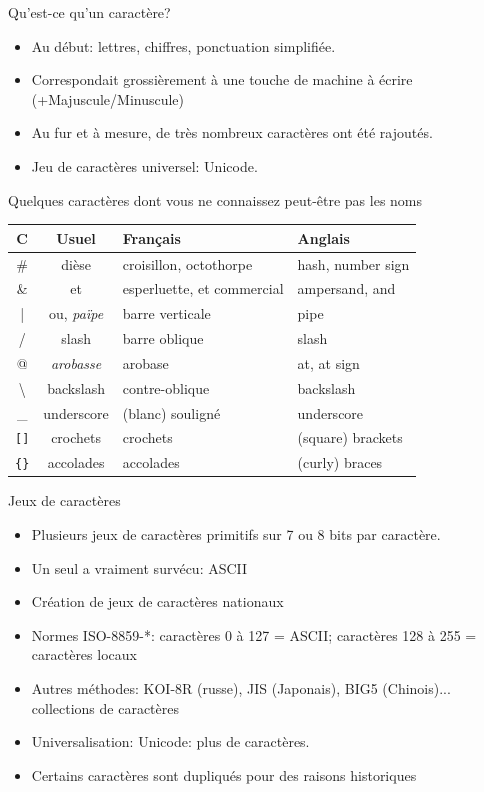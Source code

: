 \begin{frame}[fragile]{Qu'est-ce qu'un caractère?}
  \begin{itemize}
  \item Au début: lettres, chiffres, ponctuation simplifiée.
  \item[\dialogsystem] Correspondait grossièrement à une touche de
    machine à écrire (+Majuscule/Minuscule)
  \item Au fur et à mesure, de très nombreux caractères ont été rajoutés.
  \item Jeu de caractères universel: Unicode.
  \end{itemize}
  \begin{block}{Quelques caractères dont vous ne connaissez peut-être pas les noms}
    \begin{tabular}{>{\ttfamily}ccll}
      C & Usuel & Français & Anglais\\\hline
      \# & dièse & croisillon, octothorpe & hash, number sign\\
      \& & et & esperluette, et commercial & ampersand, and\\
      | & ou, \emph{païpe} & barre verticale & pipe\\
      / & slash & barre oblique & slash\\
      @ & \emph{arobasse} & arobase & at, at sign\\
      \textbackslash & backslash & contre-oblique & backslash\\
      \_ & underscore & (blanc) souligné & underscore\\
      \verb|[]| & crochets & crochets & (square) brackets\\
      \verb|{}| & accolades & accolades & (curly) braces\\
    \end{tabular}
  \end{block}
\end{frame}
\begin{frame}[label=jeucaractere]{Jeux de caractères}
  \begin{itemize}
  \item Plusieurs jeux de caractères primitifs sur 7 ou 8 bits par caractère.
  \item Un seul a vraiment survécu: ASCII    \begin{presentationonly}\hfill\hyperlink{ascii}{}\end{presentationonly}
  \item Création de jeux de caractères nationaux
  \item Normes ISO-8859-*: caractères 0 à 127 = ASCII; caractères 128 à 255 = caractères locaux
  \item Autres méthodes: KOI-8R (russe), JIS (Japonais), BIG5 (Chinois)... collections de caractères
  \item Universalisation: Unicode: plus de   caractères.
  \item[\dialogwarning] Certains caractères sont dupliqués pour des raisons
    historiques
  \end{itemize}
\end{frame}

